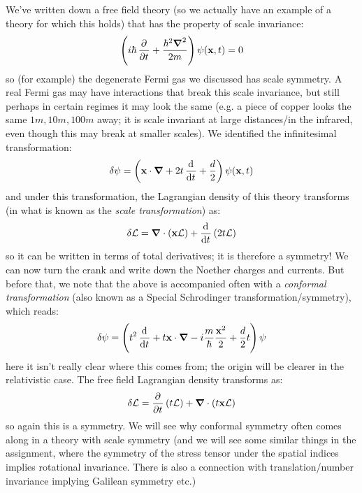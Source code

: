 We've written down a free field theory (so we actually have an example of a theory for which this holds) that has the property of scale invariance:
\begin{equation}
    \left(i\hbar\dpd{}{t} + \frac{\hbar^2\nabla^2}{2m}\right)\psi(\v{x}, t) = 0
\end{equation}
so (for example) the degenerate Fermi gas we discussed has scale symmetry. A real Fermi gas may have interactions that break this scale invariance, but still perhaps in certain regimes it may look the same (e.g. a piece of copper looks the same $1\si{m}, 10\si{m}, 100\si{m}$ away; it is scale invariant at large distances/in the infrared, even though this may break at smaller scales). We identified the infinitesimal transformation:
\begin{equation}
    \delta \psi = \left(\v{x} \cdot \nabla + 2 t\dod{}{t} + \frac{d}{2}\right)\psi(\v{x}, t)
\end{equation}
and under this transformation, the Lagrangian density of this theory transforms (in what is known as the \emph{scale transformation}) as:
\begin{equation}
    \delta \L = \nabla \cdot (\v{x}\L) + \dod{}{t}\left(2t\L\right)
\end{equation}
so it can be written in terms of total derivatives; it is therefore a symmetry! We can now turn the crank and write down the Noether charges and currents. But before that, we note that the above is accompanied often with a \emph{conformal transformation} (also known as a Special Schrodinger transformation/symmetry), which reads:
\begin{equation}\label{eq-conformalsymmetrytrans}
    \delta \psi = \left(t^2\dod{}{t} + t\v{x}\cdot\nabla - i\frac{m}{\hbar}\frac{\v{x}^2}{2} + \frac{d}{2}t\right)\psi
\end{equation}
here it isn't really clear where this comes from; the origin will be clearer in the relativistic case. The free field Lagrangian density transforms as:
\begin{equation}
    \delta \L = \dpd{}{t}\left(t\L\right) + \nabla \cdot \left(t\v{x}\L\right)
\end{equation}
so again this is a symmetry. We will see why conformal symmetry often comes along in a theory with scale symmetry (and we will see some similar things in the assignment, where the symmetry of the stress tensor under the spatial indices implies rotational invariance. There is also a connection with translation/number invariance implying Galilean symmetry etc.)

